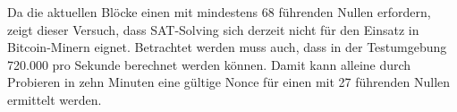 Da die aktuellen Blöcke einen  mit mindestens 68 führenden Nullen erfordern, zeigt dieser Versuch, dass SAT-Solving sich
derzeit nicht für den Einsatz in Bitcoin-Minern eignet. Betrachtet werden muss auch, dass in der Testumgebung 720.000  pro Sekunde
berechnet werden können. Damit kann alleine durch Probieren in zehn Minuten eine gültige Nonce für einen  mit 27 führenden
Nullen ermittelt werden.